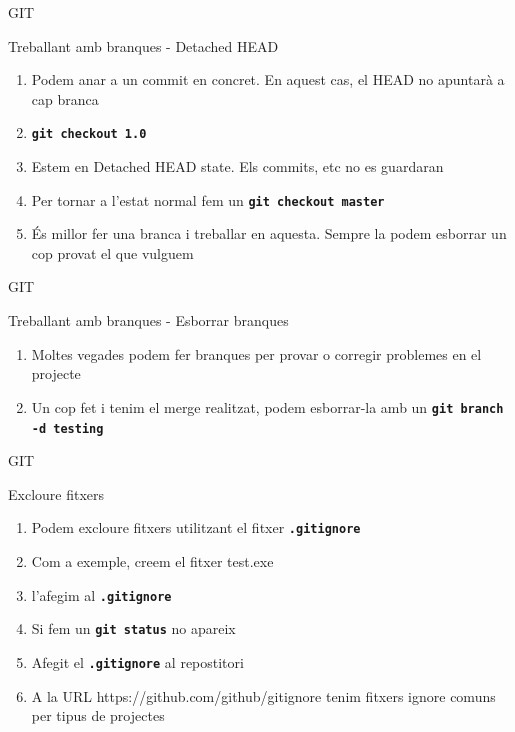 \documentclass[10pt,xcolor={rgb}]{beamer}
\begin{document}
    \begin{frame}[fragile]{GIT}
      \begin{block}{Treballant amb branques - Detached HEAD}

        \begin{enumerate}
          \item Podem anar a un commit en concret.  En aquest cas, el HEAD no apuntarà a cap branca
          \item \texttt{\textbf{git checkout 1.0}}
          \item Estem en Detached HEAD state.  Els commits, etc no es guardaran
          \item Per tornar a l'estat normal fem un \texttt{\textbf{git checkout master}}
          \item És millor fer una branca i treballar en aquesta.  Sempre la podem esborrar un cop provat el que vulguem
        \end{enumerate}

      \end{block}
    \end{frame}

    \begin{frame}[fragile]{GIT}
      \begin{block}{Treballant amb branques - Esborrar branques}

        \begin{enumerate}
          \item Moltes vegades podem fer branques per provar o corregir problemes en el projecte
          \item Un cop fet i tenim el merge realitzat, podem esborrar-la amb un \texttt{\textbf{git branch -d testing}}
        \end{enumerate}

      \end{block}
    \end{frame}

    \begin{frame}[fragile]{GIT}
      \begin{block}{Excloure fitxers}

        \begin{enumerate}
          \item Podem excloure fitxers utilitzant el fitxer \texttt{\textbf{.gitignore}}
          \item Com a exemple, creem el fitxer test.exe
          \item l'afegim al \texttt{\textbf{.gitignore}}
          \item Si fem un \texttt{\textbf{git status}} no apareix
          \item Afegit el \texttt{\textbf{.gitignore}} al repostitori
          \item A la URL https://github.com/github/gitignore tenim fitxers ignore comuns per tipus de projectes
        \end{enumerate}

      \end{block}
    \end{frame}
\end{document}
